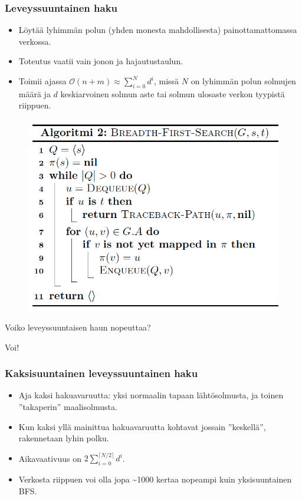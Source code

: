 \documentclass{beamer}
\begin{document}
\begin{frame}
\frametitle{Leveyssuuntainen haku}
\begin{itemize}
\item Löytää lyhimmän polun (yhden monesta mahdollisesta) painottamattomassa verkossa.
\item Toteutus vaatii vain jonon ja hajautustaulun.
\item Toimii ajassa $\mathcal{O}(n + m) \approx \sum_{i = 0}^N d^i$, missä $N$ on lyhimmän polun solmujen määrä ja $d$ keskiarvoinen solmun aste tai solmun ulosaste verkon tyypistä riippuen.
\end{itemize}
\end{frame}

\begin{frame}
\begin{figure}[H]
  \includegraphics[width=\textwidth,keepaspectratio]{bfs}
\end{figure}
\end{frame}

\begin{frame}
Voiko leveyssuuntaisen haun nopeuttaa?
\end{frame}

\begin{frame}
Voi!
\end{frame}

\begin{frame}
\frametitle{Kaksisuuntainen leveyssuuntainen haku}
\begin{itemize}
  \item Aja kaksi hakuavaruutta: yksi normaalin tapaan lähtösolmusta, ja toinen ''takaperin'' maalisolmusta.
  \item Kun kaksi yllä mainittua hakuavaruutta kohtavat jossain ''keskellä'', rakennetaan lyhin polku.
  \item Aikavaativuus on $2\sum_{i = 0}^{\lceil N / 2\rceil} d^i$.
  \item Verkosta riippuen voi olla jopa \textasciitilde 1000 kertaa nopeampi kuin yksisuuntainen BFS.
\end{itemize}
\end{frame}
\end{document}
